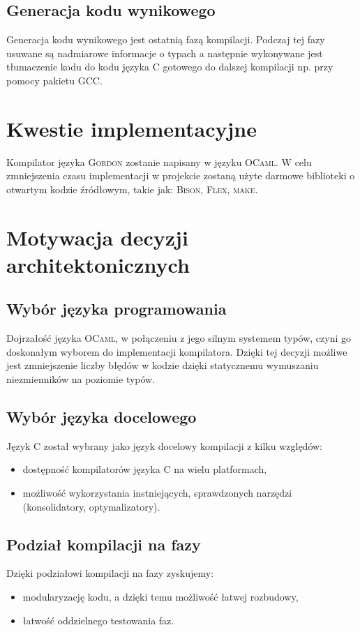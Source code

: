 \documentclass{documentation}
\begin{document}
\subsection{Generacja kodu wynikowego}
\noindent Generacja kodu wynikowego jest ostatnią fazą kompilacji. Podczaj tej fazy usuwane są
nadmiarowe informacje o typach a następnie wykonywane jest tłumaczenie kodu do kodu języka
\textsc{C} gotowego do dalszej kompilacji np. przy pomocy pakietu \textsc{GCC}.

\section{Kwestie implementacyjne}
\noindent Kompilator języka \textsc{Gordon} zostanie napisany w języku \textsc{OCaml}. W celu
zmniejszenia czasu implementacji w projekcie zostaną użyte darmowe biblioteki o otwartym
kodzie źródłowym, takie jak: \textsc{Bison}, \textsc{Flex}, \textsc{make}.

\section{Motywacja decyzji architektonicznych}
\subsection{Wybór języka programowania}
\noindent Dojrzałość języka \textsc{OCaml}, w połączeniu z jego silnym systemem typów,
czyni go doskonałym wyborem do implementacji kompilatora. Dzięki tej
decyzji możliwe jest zmniejszenie liczby błędów w kodzie dzięki statycznemu
wymuszaniu niezmienników na poziomie typów.

\subsection{Wybór języka docelowego}
\noindent Język \textsc{C} został wybrany jako język docelowy kompilacji z kilku względów:
\begin{itemize}
    \item dostępność kompilatorów języka \textsc{C} na wielu platformach,
    \item możliwość wykorzystania instniejących, sprawdzonych narzędzi (konsolidatory,
        optymalizatory).
\end{itemize}

\subsection{Podział kompilacji na fazy}
\noindent Dzięki podziałowi kompilacji na fazy zyskujemy:
\begin{itemize}
    \item modularyzację kodu, a dzięki temu możliwość łatwej rozbudowy,
    \item łatwość oddzielnego testowania faz.
\end{itemize}
\end{document}
